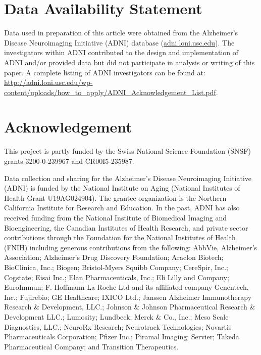 \documentclass[
  12pt]{article}
\begin{document}

\section{Data Availability Statement}\label{data-availability-statement}
Data used in preparation of this article were obtained from the Alzheimer's Disease Neuroimaging Initiative (ADNI) database (\url{adni.loni.usc.edu}). The investigators within ADNI contributed to the design and implementation of ADNI and/or provided data but did not participate in analysis or writing of this paper. A complete listing of ADNI investigators can be found at: \url{http://adni.loni.usc.edu/wp-content/uploads/how_to_apply/ADNI_Acknowledgement_List.pdf}.


\section*{Acknowledgement}

This project is partly funded by the Swiss National Science Foundation (SNSF) grants 3200-0-239967 and CR00I5-235987.

Data collection and sharing for the Alzheimer's Disease Neuroimaging Initiative (ADNI) is funded by the National Institute on Aging (National Institutes of Health Grant U19AG024904). The grantee organization is the Northern California Institute for Research and Education. In the past, ADNI has also received funding from the National Institute of Biomedical Imaging and Bioengineering, the Canadian Institutes of Health Research, and private sector contributions through the Foundation for the National Institutes of Health (FNIH) including generous contributions from the following: AbbVie, Alzheimer's Association; Alzheimer's Drug Discovery Foundation; Araclon Biotech; BioClinica, Inc.; Biogen; Bristol-Myers Squibb Company; CereSpir, Inc.; Cogstate; Eisai Inc.; Elan Pharmaceuticals, Inc.; Eli Lilly and Company; EuroImmun; F. Hoffmann-La Roche Ltd and its affiliated company Genentech, Inc.; Fujirebio; GE Healthcare; IXICO Ltd.; Janssen Alzheimer Immunotherapy Research \& Development, LLC.; Johnson \& Johnson Pharmaceutical Research \& Development LLC.; Lumosity; Lundbeck; Merck \& Co., Inc.; Meso Scale Diagnostics, LLC.; NeuroRx Research; Neurotrack Technologies; Novartis Pharmaceuticals Corporation; Pfizer Inc.; Piramal Imaging; Servier; Takeda Pharmaceutical Company; and Transition Therapeutics.
\end{document}
